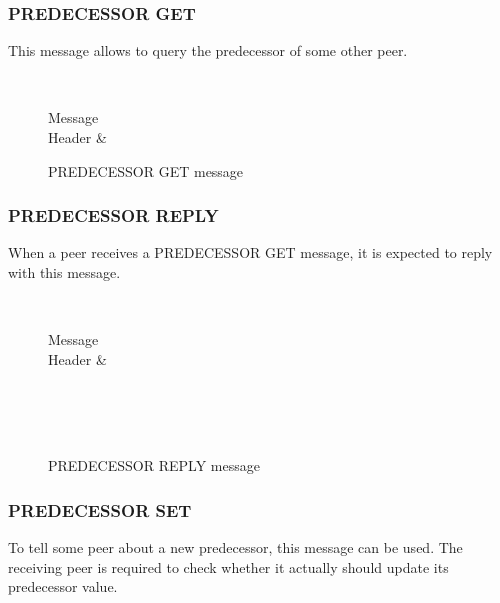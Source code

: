 \documentclass[a4paper, 11pt]{article}
\begin{document}
\subsubsection{PREDECESSOR GET}

This message allows to query the predecessor of some other peer.

\begin{figure}[H]
	\centering
	\begin{bytefield}[bitwidth=0.8em]{32}
		 \\
		\begin{rightwordgroup}{Message \\  Header}
			 & 
		\end{rightwordgroup}
	\end{bytefield}
	\caption{PREDECESSOR GET message}
	\label{PREDECESSORGET}
\end{figure}

\subsubsection{PREDECESSOR REPLY}

When a peer receives a PREDECESSOR GET message, it is expected to reply with this message.

\begin{figure}[H]
	\centering
	\begin{bytefield}[bitwidth=0.8em]{32}
		 \\
		\begin{rightwordgroup}{Message \\  Header}
			 & 
		\end{rightwordgroup} \\
		 \\
		\skippedwords \\
	\end{bytefield}
	\caption{PREDECESSOR REPLY message}
	\label{PREDECESSORREPLY}
\end{figure}

\subsubsection{PREDECESSOR SET}

To tell some peer about a new predecessor, this message can be used. The receiving peer is required to check whether it actually should update its predecessor value.
\end{document}
